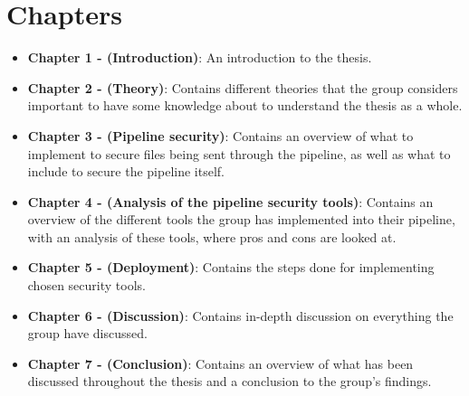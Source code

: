 \section{Chapters}
\begin{itemize}
    \item \textbf{Chapter 1 - (Introduction)}: An introduction to the thesis.
    \item \textbf{Chapter 2 - (Theory)}: Contains different theories that the group considers important 
    to have some knowledge about to understand the thesis as a whole.
    \item \textbf{Chapter 3 - (Pipeline security)}: Contains an overview of what to implement to secure files being sent through the pipeline, as well as what to include to secure the pipeline itself. 
    \item \textbf{Chapter 4 - (Analysis of the pipeline security tools)}: Contains an overview of the different tools the group has implemented into their pipeline, with an analysis of these tools, where pros and cons are looked at. 
    \item \textbf{Chapter 5 - (Deployment)}: Contains the steps done for implementing chosen security tools. 
    \item \textbf{Chapter 6 - (Discussion)}: Contains in-depth discussion on everything the group have discussed. 
    \item \textbf{Chapter 7 - (Conclusion)}: Contains an overview of what has been discussed throughout the thesis and a conclusion to the group's findings. 

\end{itemize}






